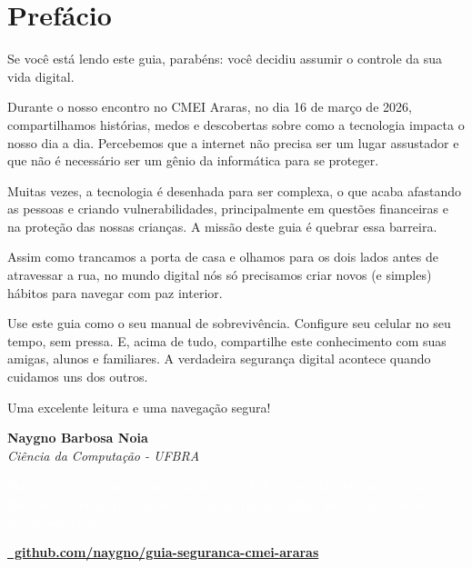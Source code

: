\section*{Prefácio}

Se você está lendo este guia, parabéns: você decidiu assumir o controle da sua vida digital.

\vspace{0.3cm}
\noindent
Durante o nosso encontro no CMEI Araras, no dia 16 de março de 2026, compartilhamos histórias, medos e descobertas sobre como a tecnologia impacta o nosso dia a dia. Percebemos que a internet não precisa ser um lugar assustador e que não é necessário ser um gênio da informática para se proteger.

\vspace{0.3cm}
\noindent
Muitas vezes, a tecnologia é desenhada para ser complexa, o que acaba afastando as pessoas e criando vulnerabilidades, principalmente em questões financeiras e na proteção das nossas crianças. A missão deste guia é quebrar essa barreira.

\vspace{0.3cm}
\noindent
Assim como trancamos a porta de casa e olhamos para os dois lados antes de atravessar a rua, no mundo digital nós só precisamos criar novos (e simples) hábitos para navegar com paz interior.

\vspace{0.3cm}
\noindent
Use este guia como o seu manual de sobrevivência. Configure seu celular no seu tempo, sem pressa. E, acima de tudo, compartilhe este conhecimento com suas amigas, alunos e familiares. A verdadeira segurança digital acontece quando cuidamos uns dos outros.

\vspace{0.3cm}
\noindent
Uma excelente leitura e uma navegação segura!


\vspace{0.3cm}
\noindent
\textbf{Naygno Barbosa Noia} \\
\textit{Ciência da Computação - UFBRA}

\vspace{1cm}
\begin{tcolorbox}[colback=NordBackground, colframe=BraveOrange, title=\faGithub\ \textbf{Código Aberto (Open Source)}]
	\textcolor{white}{Este guia foi totalmente tipografado em \LaTeX\ e seu código-fonte é aberto. Sinta-se à vontade para acessar o repositório no GitHub para sugerir melhorias ou compartilhar:}
	
	\vspace{0.3cm}
	\centering
	\href{https://github.com/naygno/guia-seguranca-cmei-araras}{\textbf{\textcolor{BitwardenBlue}{\faLink\ github.com/naygno/guia-seguranca-cmei-araras}}}
\end{tcolorbox}

